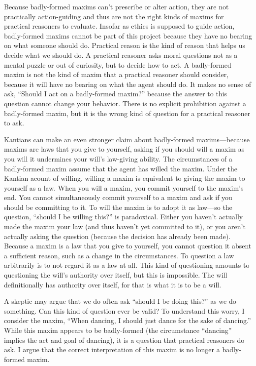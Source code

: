 \begin{isabellebody}
\begin{isamarkuptext}
Because badly-formed maxims can't prescribe or alter action, they are not practically action-guiding and 
thus are not the right kinds of maxims for practical reasoners to evaluate. Insofar as ethics 
is supposed to guide action, badly-formed maxims cannot be part of this project because they
have no bearing on what someone should do. Practical reason is the kind of reason that helps us decide 
what we should do. A practical reasoner asks moral questions not as a mental puzzle or out of curiosity, but 
to decide how to act. A badly-formed maxim is not the kind of maxim that a practical reasoner should consider, because it
will have no bearing on what the agent should do. It makes no sense of ask, ``Should I act on a badly-formed
maxim?'' because the answer to this question cannot change your behavior. There is no explicit prohibition 
against a badly-formed maxim, but it is the wrong kind of question for a practical reasoner to ask.

Kantians can make an even stronger claim about badly-formed maxims—because maxims are laws that you 
give to yourself, asking if you should will a maxim as you will it undermines your will's law-giving 
ability. The circumstances of a badly-formed maxim assume that the agent has willed the maxim. Under 
the Kantian acount of willing, willing a maxim is equivalent to giving the maxim to yourself as a law. 
When you will a maxim, you commit yourself to the maxim's end. You cannot simultaneously 
commit yourself to a maxim and ask if you should be committing to it. To will the maxim is to adopt it as 
law—so the question, ``should I be willing this?'' is paradoxical. Either you haven't actually made 
the maxim your law (and thus haven't yet committed to it), or you aren't actually asking 
the question (because the decision has already been made). Because a maxim is a law that you give to 
yourself, you cannot question it absent a sufficient reason, such as a change in the circumstances. 
To question a law arbitrarily is to not regard it as a law at all. This kind of questioning amounts to 
questioning the will's authority over itself, but this is impossible. The will definitionally has authority 
over itself, for that is what it is to be a will. 

A skeptic may argue that we do often ask ``should I be doing this?'' as we do something. 
Can this kind of question ever be valid? To understand this worry, I consider the maxim, 
``When dancing, I should just dance for the sake of dancing.'' While this maxim appears to be badly-formed (the 
circumstance ``dancing'' implies the act and goal of dancing), it is a question that practical reasoners 
do ask. I argue that the correct interpretation of this maxim is no longer a badly-formed maxim.


\end{isamarkuptext}
\end{isabellebody}
